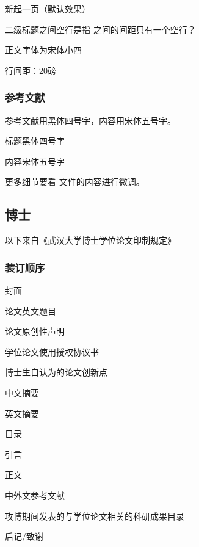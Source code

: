 \begin{points}
  \item {} 新起一页（默认效果）
  \item 二级标题之间空行是指  之间的间距只有一个空行？
  \item 正文字体为宋体小四
  \item 行间距：20磅
\end{points}


\subsubsection{参考文献}

\begin{reference}
  参考文献用黑体四号字，内容用宋体五号字。
\end{reference}

\begin{points}
  \item 标题黑体四号字
  \item 内容宋体五号字
\end{points}

更多细节要看  文件的内容进行微调。


\subsection{博士}

以下来自《武汉大学博士学位论文印制规定》


\subsubsection{装订顺序}

\begin{choices}[label = \arabic*.]
  \item 封面
  \item 论文英文题目
  \item 论文原创性声明
  \item 学位论文使用授权协议书
  \item 博士生自认为的论文创新点
  \item 中文摘要
  \item 英文摘要
  \item 目录
  \item 引言
  \item 正文
  \item 中外文参考文献
  \item 攻博期间发表的与学位论文相关的科研成果目录
  \item 后记/致谢
\end{choices}


